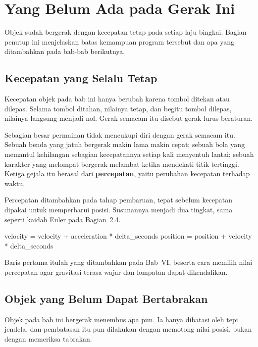 \section{Yang Belum Ada pada Gerak Ini}
\label{sec:belum-ada-gerak}

Objek sudah bergerak dengan kecepatan tetap pada setiap laju bingkai. Bagian
penutup ini menjelaskan batas kemampuan program tersebut dan apa yang
ditambahkan pada bab-bab berikutnya.

\subsection{Kecepatan yang Selalu Tetap}

Kecepatan objek pada bab ini hanya berubah karena tombol ditekan atau dilepas.
Selama tombol ditahan, nilainya tetap, dan begitu tombol dilepas, nilainya
langsung menjadi nol. Gerak semacam itu disebut gerak lurus beraturan.

Sebagian besar permainan tidak mencukupi diri dengan gerak semacam itu.
Sebuah benda yang jatuh bergerak makin lama makin cepat; sebuah bola yang
memantul kehilangan sebagian kecepatannya setiap kali menyentuh lantai; sebuah
karakter yang melompat bergerak melambat ketika mendekati titik tertinggi.
Ketiga gejala itu berasal dari \textbf{percepatan}, yaitu perubahan kecepatan
terhadap waktu.

Percepatan ditambahkan pada tahap pembaruan, tepat sebelum kecepatan dipakai
untuk memperbarui posisi. Susunannya menjadi dua tingkat, sama seperti kaidah
Euler pada Bagian~2.4.

\begin{kodekeluaran}
velocity = velocity + acceleration * delta_seconds
position = position + velocity * delta_seconds
\end{kodekeluaran}

Baris pertama itulah yang ditambahkan pada Bab~VI, beserta cara memilih nilai
percepatan agar gravitasi terasa wajar dan lompatan dapat dikendalikan.

\subsection{Objek yang Belum Dapat Bertabrakan}

Objek pada bab ini bergerak menembus apa pun. Ia hanya dibatasi oleh tepi
jendela, dan pembatasan itu pun dilakukan dengan memotong nilai posisi, bukan
dengan memeriksa tabrakan.

